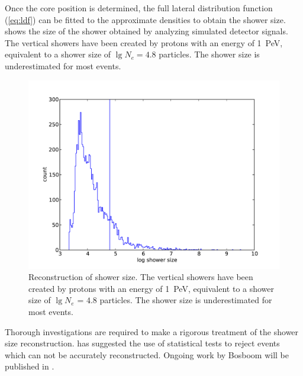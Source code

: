 Once the core position is determined, the full lateral distribution function
(\eqref{eq:ldf}) can be fitted to the approximate densities to obtain the shower
size.
 shows the size of the shower obtained by analyzing
simulated detector signals.
The vertical showers have been created by protons with an energy of
\SI{1}{\peta\electronvolt}, equivalent to a shower size of $\lg N_e = 4.8$
particles. The shower size is underestimated for most events.
\begin{figure}
\centering
\includegraphics[width=.8\linewidth]{raw-plots/COR-plot_shower_size_hist-GROUND-GAUSS_20.pdf}
\caption{Reconstruction of shower size.  The vertical showers have been
created by protons with an energy of \SI{1}{\peta\electronvolt},
equivalent to a shower size of $\lg N_e$ = $4.8$ particles.  The shower size is
underestimated for most events.}
\label{fig:shower-size}
\end{figure}

Thorough investigations are required to make a rigorous treatment of the shower
size reconstruction. \textcite{Steijger:2012-energy} has suggested the use of
statistical tests to reject events which can not be accurately reconstructed.
Ongoing work by Bosboom will be published in \cite{Bosboom:2012}.

